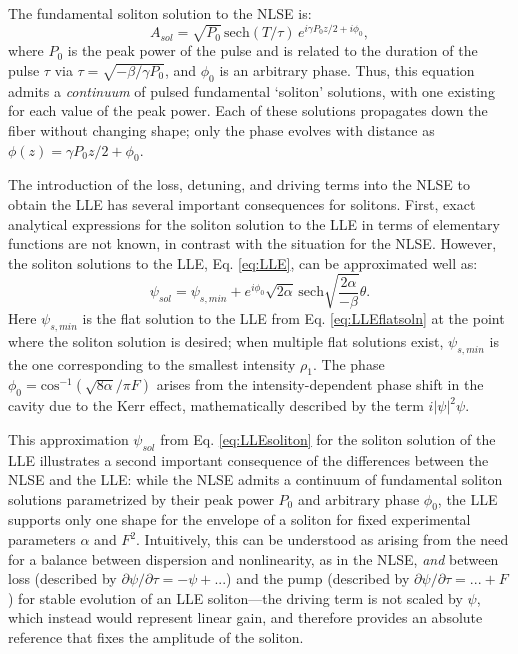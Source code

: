 {The fundamental soliton solution to the NLSE is:
\begin{equation}
A_{sol}=\sqrt{P_0}\, \mathrm{sech}\left(T/\tau\right)\,e^{i\gamma P_0 z/2+i\phi_0},
\end{equation}
where $P_0$ is the peak power of the pulse and is related to the duration of the pulse $\tau$ via $\tau=\sqrt{-\beta/\gamma P_0}$, and $\phi_0$ is an arbitrary phase. Thus, this equation admits a \textit{continuum} of pulsed fundamental `soliton' solutions, with one existing for each value of the peak power. Each of these solutions propagates down the fiber without changing shape; only the phase evolves with distance as $\phi(z)=\gamma P_0 z/2+\phi_0$.


The introduction of the loss, detuning, and driving terms into the NLSE to obtain the LLE has several important consequences for solitons. First, exact analytical expressions for the soliton solution to the LLE in terms of elementary functions are not known, in contrast with the situation for the NLSE. However, the soliton solutions to the LLE, Eq. \ref{eq:LLE}, can be approximated well as:
\begin{equation}
\psi_{sol}=\psi_{s,min}+e^{i\phi_0}\sqrt{2\alpha}\,\mathrm{sech}\sqrt{\frac{2\alpha}{-\beta}}\theta. \label{eq:LLEsoliton}
\end{equation}
Here $\psi_{s,min}$ is the flat solution to the LLE from Eq. \ref{eq:LLEflatsoln} at the point where the soliton solution is desired; when multiple flat solutions exist, $\psi_{s,min}$ is the one corresponding to the smallest intensity $\rho_1$. The phase $\phi_0=\mathrm{cos}^{-1}(\sqrt{8\alpha}/\pi F)$ arises from the intensity-dependent phase shift in the cavity due to the Kerr effect, mathematically described by the term $i|\psi|^2\psi$. 

This approximation $\psi_{sol}$ from Eq. \ref{eq:LLEsoliton} for the soliton solution of the LLE illustrates a second important consequence of the differences between the NLSE and the LLE: while the NLSE admits a continuum of fundamental soliton solutions parametrized by their peak power $P_0$ and arbitrary phase $\phi_0$, the LLE supports only one shape for the envelope of a soliton for fixed experimental parameters $\alpha$ and $F^2$. Intuitively, this can be understood as arising from the need for a balance between dispersion and nonlinearity, as in the NLSE, \textit{and} between loss (described by $\partial\psi/\partial\tau=-\psi+...$) and the pump (described by $\partial\psi/\partial\tau=...+F$) for stable evolution of an LLE soliton---the driving term is not scaled by $\psi$, which instead would represent linear gain, and therefore provides an absolute reference that fixes the amplitude of the soliton.

}
